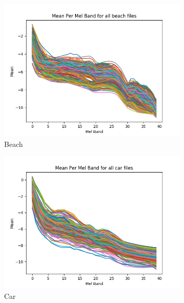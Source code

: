 \documentclass[11pt]{article}
\begin{document}
\begin{figure}[h]
	\centering
	\begin{subfigure}[t]{0.31\textwidth}
		\centering
		\includegraphics[width=\textwidth]{figures/beach.png}
		\caption{Beach}
	\end{subfigure}
	\begin{subfigure}[t]{0.31\textwidth}
		\centering
		\includegraphics[width=\textwidth]{figures/car.png}
		\caption{Car}
	\end{subfigure}
	\begin{subfigure}[t]{0.31\textwidth}
		\centering

\end{subfigure}
\end{figure}
\end{document}
